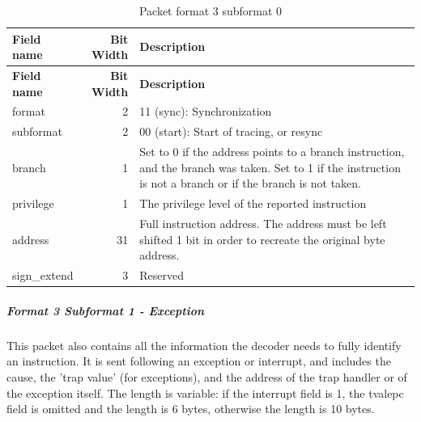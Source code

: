 \documentclass[main\_\_EN.tex]{subfiles}
\begin{document}
\begin{longtable}[c]{ |l|r|L{10cm}| }
    \caption{Packet format 3 subformat 0}
    \label{tab:f3s0}
    \\\hline{}
    \textbf{Field name} & \textbf{Bit Width} & \textbf{Description} \\\hline
    \endfirsthead
    \textbf{Field name} & \textbf{Bit Width} & \textbf{Description} \\\hline
    \endhead
    \endfoot
    \endlastfoot

    format & 2 & 11 (sync): Synchronization \\\hline
    subformat & 2 & 00 (start): Start of tracing, or resync \\\hline
    branch & 1 & Set to 0 if the address points to a branch instruction, and the branch was taken. Set to 1 if the instruction is not a branch or if the branch is not taken. \\\hline
    privilege & 1 & The privilege level of the reported instruction \\\hline
    address & 31 & Full instruction address. The address must be left shifted 1 bit in order to recreate the original byte address. \\\hline
    sign\_extend & 3 & Reserved \\\hline
 \end{longtable}

\subparagraph{Format 3 Subformat 1 - Exception}
This packet also contains all the information the decoder needs to fully identify an instruction. It
is sent following an exception or interrupt, and includes the cause, the 'trap value' (for exceptions),
and the address of the trap handler or of the exception itself. The length is variable: if the interrupt field is 1, the tvalepc field is omitted and the length is 6 bytes, otherwise the length is 10 bytes.
\end{document}
